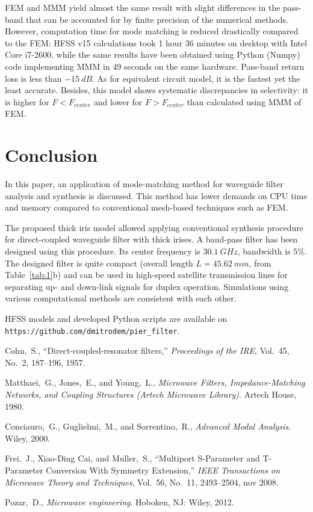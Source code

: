 \documentclass{pj}
\begin{document}
FEM and MMM yield almost the same result with slight differences in
the pass-band that can be accounted for by finite precision of the
numerical methods. However, computation time for mode matching is
reduced drastically compared to the FEM: HFSS v15 calculations took 1
hour 36 minutes on desktop with Intel Core i7-2600, while the same
results have been obtained using Python (Numpy) code implementing MMM
in 49 seconds on the same hardware. Pass-band return loss is less than
$-15~dB$. As for equivalent circuit model, it is the fastest yet the
least accurate. Besides, this model shows systematic discrepancies in
selectivity: it is higher for $F < F_{center}$ and lower for
$F > F_{center}$ than calculated using MMM of FEM.

\section{Conclusion}
\label{sec:conclusion}
In this paper, an application of mode-matching method for waveguide
filter analysis and synthesis is discussed. This method has lower
demands on CPU time and memory compared to conventional mesh-based
techniques such as FEM.

The proposed thick iris model allowed applying conventional synthesis
procedure for direct-coupled waveguide filter with thick irises. A
band-pass filter has been designed using this procedure. Its center
frequency is $30.1~GHz$, bandwidth is $5\%$. The designed filter is
quite compact (overall length $L = 45.62~mm$, from
Table~\ref{tab:1}b) and can be used in high-speed
satellite transmission lines for separating up- and down-link signals
for duplex operation. Simulations using various computational methods
are consistent with each other.

HFSS models and developed Python scripts are available on
\texttt{https://github.com/dmitrodem/pier\_filter}.

\begin{thebibliography}{1}

Cohn,~S., ``Direct-coupled-resonator filters,'' {\it Proceedings of the {IRE}},
  Vol.~45, No.~2, 187--196, 1957.

Matthaei,~G., Jones,~E., and Young,~L., {\it Microwave Filters,
  Impedance-Matching Networks, and Coupling Structures (Artech Microwave
  Library)}.
\newblock Artech House, 1980.

Conciauro,~G., Guglielmi,~M., and Sorrentino,~R., {\it {Advanced Modal
  Analysis}}.
\newblock Wiley, 2000.

Frei,~J., {Xiao-Ding Cai}, and Muller,~S., ``{Multiport S-Parameter and
  T-Parameter Conversion With Symmetry Extension},'' {\it IEEE Transactions on
  Microwave Theory and Techniques}, Vol.~56, No.~11, 2493--2504, nov 2008.

Pozar,~D., {\it Microwave engineering}.
\newblock Hoboken, NJ: Wiley, 2012.

\end{thebibliography}
\end{document}
